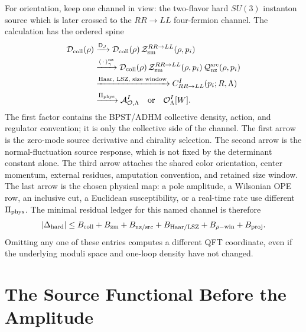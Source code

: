 \begin{remark}
\label{rem:instanton-su3-nf2-hard-channel-spine}
For orientation, keep one channel in view: the two-flavor hard
\(SU(3)\) instanton source which is later crossed to the \(RR\to LL\)
four-fermion channel.  The calculation has the ordered spine
\begin{equation}
\begin{aligned}
  \mathcal D_{\rm coll}(\rho)
  &\xrightarrow{\mathsf D_J}
  \mathcal D_{\rm coll}(\rho)\,
  \mathcal Z_{\rm zm}^{RR\to LL}(\rho,p_i)\\
  &\xrightarrow{\langle\,\cdot\,\rangle_{\gamma}^{\rm nz}}
  \mathcal D_{\rm coll}(\rho)\,
  \mathcal Z_{\rm zm}^{RR\to LL}(\rho,p_i)\,
  \mathcal Q_{\rm nz}^{\rm src}(\rho,p_i)\\
  &\xrightarrow{\hbox{\scriptsize Haar, LSZ, size window}}
  C^I_{RR\to LL}(p_i;R,\Lambda)\\
  &\xrightarrow{\Pi_{\rm phys}}
  \mathcal A^I_{\mathcal O,\Lambda}
  \quad\hbox{or}\quad
  \mathcal O^I_\Lambda[W].
\end{aligned}
  \label{eq:instanton-su3-nf2-hard-channel-spine}
\end{equation}
The first factor contains the BPST/ADHM collective density, action, and
regulator convention; it is only the collective side of the channel.  The
first arrow is the zero-mode source derivative and chirality selection.  The
second arrow is the normal-fluctuation source response, which is not fixed by
the determinant constant alone.  The third arrow attaches the shared color
orientation, center momentum, external residues, amputation convention, and
retained size window.  The last arrow is the chosen physical map: a pole
amplitude, a Wilsonian OPE row, an inclusive cut, a Euclidean susceptibility,
or a real-time rate use different \(\Pi_{\rm phys}\).  The minimal residual
ledger for this named channel is therefore
\[
  |\Delta_{\rm hard}|
  \le
  B_{\rm coll}+B_{\rm zm}+B_{\rm nz/src}
  +B_{\rm Haar/LSZ}+B_{\rho{\rm -win}}+B_{\rm proj}.
\]
Omitting any one of these entries computes a different QFT coordinate, even
if the underlying moduli space and one-loop density have not changed.
\end{remark}

\section{The Source Functional Before the Amplitude}
\label{sec:instanton-source-functional-route}

